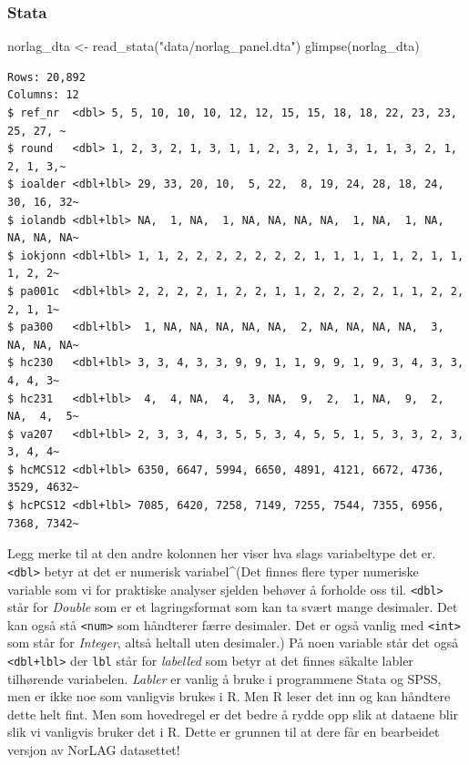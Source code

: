 \documentclass[
  letterpaper,
  DIV=11,
  numbers=noendperiod]{scrreprt}
\newenvironment{Shaded}{\begin{snugshade}}{\end{snugshade}}
\newcommand{\FunctionTok}[1]{\textcolor[rgb]{0.28,0.35,0.67}{#1}}
\newcommand{\NormalTok}[1]{\textcolor[rgb]{0.00,0.23,0.31}{#1}}
\newcommand{\OtherTok}[1]{\textcolor[rgb]{0.00,0.23,0.31}{#1}}
\newcommand{\StringTok}[1]{\textcolor[rgb]{0.13,0.47,0.30}{#1}}
\theoremstyle{definition}
\theoremstyle{remark}
\begin{document}
\hypertarget{stata}{%
\subsubsection{Stata}\label{stata}}

\begin{Shaded}
\begin{Highlighting}[]
\NormalTok{norlag\_dta }\OtherTok{\textless{}{-}} \FunctionTok{read\_stata}\NormalTok{(}\StringTok{"data/norlag\_panel.dta"}\NormalTok{)}
\FunctionTok{glimpse}\NormalTok{(norlag\_dta)}
\end{Highlighting}
\end{Shaded}

\begin{verbatim}
Rows: 20,892
Columns: 12
$ ref_nr  <dbl> 5, 5, 10, 10, 10, 12, 12, 15, 15, 18, 18, 22, 23, 23, 25, 27, ~
$ round   <dbl> 1, 2, 3, 2, 1, 3, 1, 1, 2, 3, 2, 1, 3, 1, 1, 3, 2, 1, 2, 1, 3,~
$ ioalder <dbl+lbl> 29, 33, 20, 10,  5, 22,  8, 19, 24, 28, 18, 24, 30, 16, 32~
$ iolandb <dbl+lbl> NA,  1, NA,  1, NA, NA, NA, NA,  1, NA,  1, NA, NA, NA, NA~
$ iokjonn <dbl+lbl> 1, 1, 2, 2, 2, 2, 2, 2, 2, 1, 1, 1, 1, 1, 2, 1, 1, 1, 2, 2~
$ pa001c  <dbl+lbl> 2, 2, 2, 2, 1, 2, 2, 1, 1, 2, 2, 2, 2, 1, 1, 2, 2, 2, 1, 1~
$ pa300   <dbl+lbl>  1, NA, NA, NA, NA, NA,  2, NA, NA, NA, NA,  3, NA, NA, NA~
$ hc230   <dbl+lbl> 3, 3, 4, 3, 3, 9, 9, 1, 1, 9, 9, 1, 9, 3, 4, 3, 3, 4, 4, 3~
$ hc231   <dbl+lbl>  4,  4, NA,  4,  3, NA,  9,  2,  1, NA,  9,  2, NA,  4,  5~
$ va207   <dbl+lbl> 2, 3, 3, 4, 3, 5, 5, 3, 4, 5, 5, 1, 5, 3, 3, 2, 3, 3, 4, 4~
$ hcMCS12 <dbl+lbl> 6350, 6647, 5994, 6650, 4891, 4121, 6672, 4736, 3529, 4632~
$ hcPCS12 <dbl+lbl> 7085, 6420, 7258, 7149, 7255, 7544, 7355, 6956, 7368, 7342~
\end{verbatim}

Legg merke til at den andre kolonnen her viser hva slags variabeltype
det er. \texttt{\textless{}dbl\textgreater{}} betyr at det er numerisk
variabel\^{}(Det finnes flere typer numeriske variable som vi for
praktiske analyser sjelden behøver å forholde oss til.
\texttt{\textless{}dbl\textgreater{}} står for \emph{Double} som er et
lagringsformat som kan ta svært mange desimaler. Det kan også stå
\texttt{\textless{}num\textgreater{}} som håndterer færre desimaler. Det
er også vanlig med \texttt{\textless{}int\textgreater{}} som står for
\emph{Integer}, altså heltall uten desimaler.) På noen variable står det
også \texttt{\textless{}dbl+lbl\textgreater{}} der \texttt{lbl} står for
\emph{labelled} som betyr at det finnes såkalte labler tilhørende
variabelen. \emph{Labler} er vanlig å bruke i programmene Stata og SPSS,
men er ikke noe som vanligvis brukes i R. Men R leser det inn og kan
håndtere dette helt fint. Men som hovedregel er det bedre å rydde opp
slik at dataene blir slik vi vanligvis bruker det i R. Dette er grunnen
til at dere får en bearbeidet versjon av NorLAG datasettet!
\end{document}
